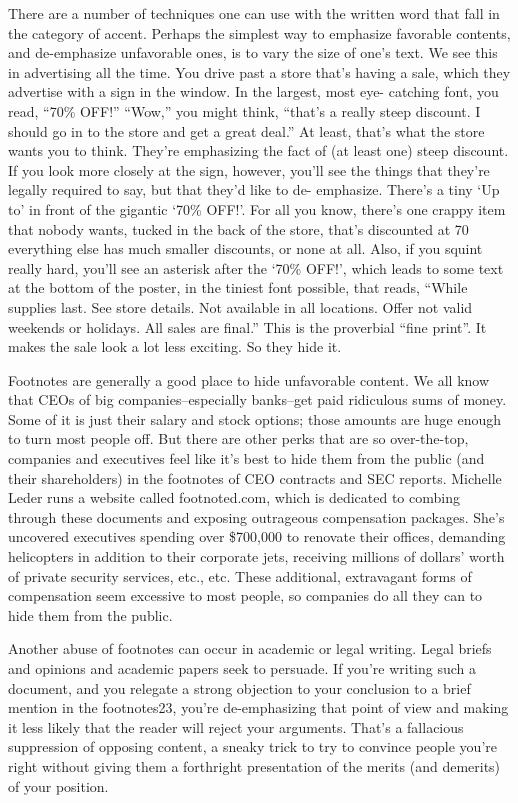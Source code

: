 There are a number of techniques one can use with the written word that fall in the category of
accent. Perhaps the simplest way to emphasize favorable contents, and de-emphasize unfavorable
ones, is to vary the size of one's text. We see this in advertising all the time. You drive past a store
that's having a sale, which they advertise with a sign in the window. In the largest, most eye-
catching font, you read, ``70\% 
OFF!'' ``Wow,'' you might think, ``that's a really steep discount. I
should go in to the store and get a great deal.'' At least, that's what the store wants you to think.
They're emphasizing the fact of (at least one) steep discount. If you look more closely at the sign,
however, you'll see the things that they're legally required to say, but that they'd like to de-
emphasize. There's a tiny `Up to' in front of the gigantic `70\% 
OFF!'. For all you know, there's
one crappy item that nobody wants, tucked in the back of the store, that's discounted at 70%
everything else has much smaller discounts, or none at all. Also, if you squint really hard, you'll
see an asterisk after the `70\% 
OFF!', which leads to some text at the bottom of the poster, in the
tiniest font possible, that reads, ``While supplies last. See store details. Not available in all
locations. Offer not valid weekends or holidays. All sales are final.'' This is the proverbial ``fine
print''. It makes the sale look a lot less exciting. So they hide it.

Footnotes are generally a good place to hide unfavorable content. We all know that CEOs of big
companies--especially banks--get paid ridiculous sums of money. Some of it is just their salary
and stock options; those amounts are huge enough to turn most people off. But there are other
perks that are so over-the-top, companies and executives feel like it's best to hide them from the
public (and their shareholders) in the footnotes of CEO contracts and SEC reports. Michelle Leder
runs a website called footnoted.com, which is dedicated to combing through these documents and
exposing outrageous compensation packages. She's uncovered executives spending over \$700,000
to renovate their offices, demanding helicopters in addition to their corporate jets, receiving
millions of dollars' worth of private security services, etc., etc. These additional, extravagant forms
of compensation seem excessive to most people, so companies do all they can to hide them from
the public.

Another abuse of footnotes can occur in academic or legal writing. Legal briefs and opinions and
academic papers seek to persuade. If you're writing such a document, and you relegate a strong
objection to your conclusion to a brief mention in the footnotes23, you're de-emphasizing that point
of view and making it less likely that the reader will reject your arguments. That's a fallacious
suppression of opposing content, a sneaky trick to try to convince people you're right without
giving them a forthright presentation of the merits (and demerits) of your position.

